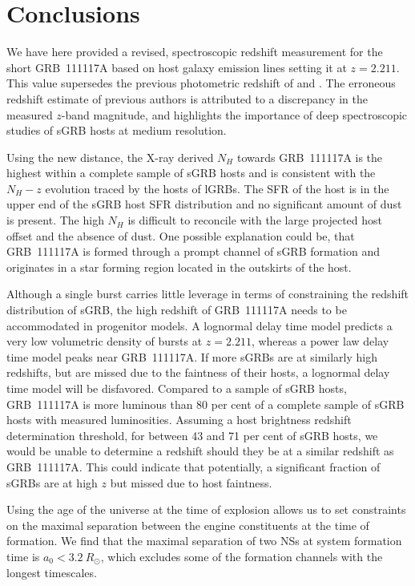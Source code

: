 \documentclass{aa}    %
\begin{document}
\section{Conclusions}

We have here provided a revised, spectroscopic redshift measurement for the
short GRB~111117A based on host galaxy emission lines setting it at $z = 2.211$.
This value supersedes the previous photometric redshift of \citet{Margutti2012}
and \citet{Sakamoto2013}. The erroneous redshift estimate of previous authors is
attributed to a discrepancy in the measured $z$-band magnitude, and highlights
the importance of deep spectroscopic studies of sGRB hosts at medium resolution.

Using the new distance, the X-ray derived $N_H$ towards GRB~111117A is the
highest within a complete sample of sGRB hosts and is consistent with the
$N_H-z$ evolution traced by the hosts of lGRBs. The SFR of the host is in the
upper end of the sGRB host SFR distribution and no significant amount of dust is
present. The high $N_H$ is difficult to reconcile with the large projected host
offset and the absence of dust. One possible explanation could be, that
GRB~111117A is formed through a prompt channel of sGRB formation and originates
in a star forming region located in the outskirts of the host.

Although a single burst carries little leverage in terms of constraining the
redshift distribution of sGRB, the high redshift of GRB~111117A needs to be
accommodated in progenitor models. A lognormal delay time model predicts a very
low volumetric density of bursts at $z = 2.211$, whereas a power law delay time
model peaks near GRB~111117A. If more sGRBs are at similarly high redshifts, but
are missed due to the faintness of their hosts, a lognormal delay time model
will be disfavored. Compared to a sample of sGRB hosts, GRB~111117A is more
luminous than 80 per cent of a complete sample of sGRB hosts with measured
luminosities. Assuming a host brightness redshift determination threshold, for
between 43 and 71 per cent of sGRB hosts, we would be unable to determine a
redshift should they be at a similar redshift as GRB~111117A. This could
indicate that potentially, a significant fraction of sGRBs are at high $z$ but
missed due to host faintness.

Using the age of the universe at the time of explosion allows us to set
constraints on the maximal separation between the engine constituents at the
time of formation. We find that the maximal separation of two NSs at system
formation time is $a_0 < 3.2~R_\odot$, which excludes some of the formation
channels with the longest timescales.
\end{document}
